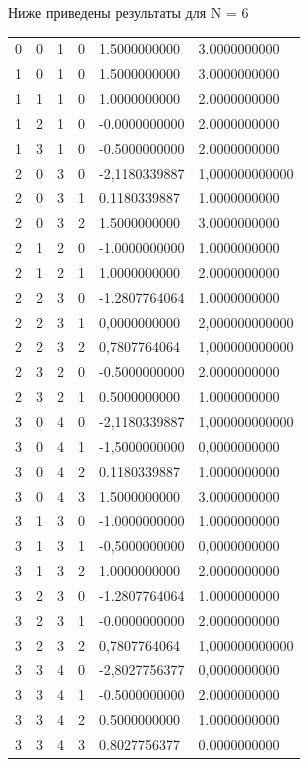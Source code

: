 \documentclass[11pt]{article}
\begin{document}
Ниже приведены результаты для N = 6 \\
\begin{tabular}{llllll}
 0 & 0 & 1 & 0 & 1.5000000000 & 3.0000000000 \\
 1 & 0 & 1 & 0 & 1.5000000000 & 3.0000000000 \\
 1 & 1 & 1 & 0 & 1.0000000000 & 2.0000000000 \\
 1 & 2 & 1 & 0 & -0.0000000000 & 2.0000000000 \\
 1 & 3 & 1 & 0 & -0.5000000000 & 2.0000000000 \\
 2 & 0 & 3 & 0 & -2,1180339887 & 1,000000000000 \\
 2 & 0 & 3 & 1 & 0.1180339887 & 1.0000000000 \\
 2 & 0 & 3 & 2 & 1.5000000000 & 3.0000000000 \\
 2 & 1 & 2 & 0 & -1.0000000000 & 1.0000000000 \\
 2 & 1 & 2 & 1 & 1.0000000000 & 2.0000000000 \\
 2 & 2 & 3 & 0 & -1.2807764064 & 1.0000000000 \\
 2 & 2 & 3 & 1 & 0,0000000000 & 2,000000000000 \\
 2 & 2 & 3 & 2 & 0,7807764064 & 1,000000000000 \\
 2 & 3 & 2 & 0 & -0.5000000000 & 2.0000000000 \\
 2 & 3 & 2 & 1 & 0.5000000000 & 1.0000000000 \\
 3 & 0 & 4 & 0 & -2,1180339887 & 1,000000000000 \\
 3 & 0 & 4 & 1 & -1,5000000000 & 0,0000000000 \\
 3 & 0 & 4 & 2 & 0.1180339887 & 1.0000000000 \\
 3 & 0 & 4 & 3 & 1.5000000000 & 3.0000000000 \\
 3 & 1 & 3 & 0 & -1.0000000000 & 1.0000000000 \\
 3 & 1 & 3 & 1 & -0,5000000000 & 0,0000000000 \\
 3 & 1 & 3 & 2 & 1.0000000000 & 2.0000000000 \\
 3 & 2 & 3 & 0 & -1.2807764064 & 1.0000000000 \\
 3 & 2 & 3 & 1 & -0.0000000000 & 2.0000000000 \\
 3 & 2 & 3 & 2 & 0,7807764064 & 1,000000000000 \\
 3 & 3 & 4 & 0 & -2,8027756377 & 0,0000000000 \\
 3 & 3 & 4 & 1 & -0.5000000000 & 2.0000000000 \\
 3 & 3 & 4 & 2 & 0.5000000000 & 1.0000000000 \\
 3 & 3 & 4 & 3 & 0.8027756377 & 0.0000000000 \\

\end{tabular}
\end{document}
